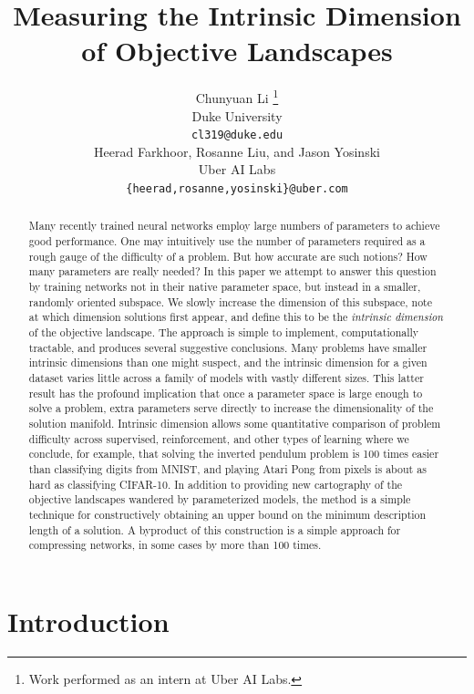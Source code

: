 \documentclass{article} %
\title{Measuring the Intrinsic Dimension \\ of Objective Landscapes}
\author{Chunyuan Li \thanks{Work performed as an intern at Uber AI Labs.} \\
Duke University\\
\texttt{cl319@duke.edu} \\
\And
Heerad Farkhoor, Rosanne Liu, and Jason Yosinski \\
Uber AI Labs\\
\texttt{\{heerad,rosanne,yosinski\}@uber.com} 
}
\begin{document}
\maketitle

\begin{abstract}

Many recently trained neural networks employ large numbers of parameters to achieve good performance. One may intuitively use the number of parameters required as a rough gauge of the difficulty of a problem. But how accurate are such notions? How many parameters are really needed? In this paper we attempt to answer this question by training networks not in their native parameter space, but instead in a smaller, randomly oriented subspace. We slowly increase the dimension of this subspace, note at which dimension solutions first appear, and define this to be the \emph{intrinsic dimension} of the objective landscape. The approach is simple to implement, computationally tractable, and produces several suggestive conclusions. Many problems have smaller intrinsic dimensions than one might suspect, and the intrinsic dimension for a given dataset varies little across a family of models with vastly different sizes. This latter result has the profound implication that once a parameter space is large enough to solve a problem, extra parameters serve directly to increase the dimensionality of the solution manifold. Intrinsic dimension allows some quantitative comparison of problem difficulty across supervised, reinforcement, and other types of learning where we conclude, for example, that solving the inverted pendulum problem is 100 times easier than classifying digits from MNIST, and playing Atari Pong from pixels is about as hard as classifying CIFAR-10. In addition to providing new cartography of the objective landscapes wandered by parameterized models, the method is a simple technique for constructively obtaining an upper bound on the minimum description length of a solution. A byproduct of this construction is a simple approach for compressing networks, in some cases by more than 100 times.

\end{abstract}



\section{Introduction}
\end{document}
